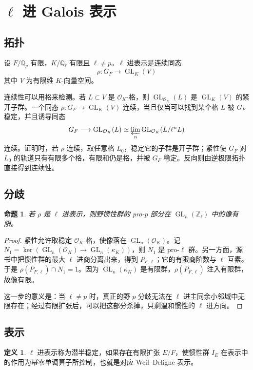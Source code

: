 \documentclass[11pt,a4paper,openany]{ctexbook}
\numberwithin{equation}{chapter}
\newcommand{\Q}{\mathbb{Q}}
\newcommand{\Z}{\mathbb{Z}}
\newcommand{\GL}{\operatorname{GL}}
\theoremstyle{plain}
\newtheorem{proposition}[theorem]{命题}
\theoremstyle{definition}
\newtheorem{definition}[theorem]{定义}
\theoremstyle{remark}
\begin{document}
\section{\texorpdfstring{$\ell$ 进 Galois 表示}{ell 进 Galois 表示}}

\subsection{拓扑}

设 $F/\Q_p$ 有限，$K/\Q_\ell$ 有限且 $\ell\ne p$。$\ell$ 进表示是连续同态
\[
  \rho:G_F\to\GL_K(V)
\]
其中 $V$ 为有限维 $K$-向量空间。

连续性可以用格来检测。若 $L\subset V$ 是 $\mathcal O_K$-格，则 $\GL_{\mathcal O_K}(L)$ 是 $\GL_K(V)$ 的紧开子群。一个同态 $\rho:G_F\to\GL_K(V)$ 连续，当且仅当可以找到某个格 $L$ 被 $G_F$ 稳定，并且诱导同态
\[
  G_F\longrightarrow \GL_{\mathcal O_K}(L)
  \simeq \varprojlim_n\GL_{\mathcal O_K}(L/\ell^nL)
\]
连续。证明时，若 $\rho$ 连续，取任意格 $L_0$，稳定它的子群是开子群；紧性使 $G_F$ 对 $L_0$ 的轨道只有有限多个格，有限和仍是格，并被 $G_F$ 稳定。反向则由逆极限拓扑直接得到连续性。

\subsection{分歧}

\begin{proposition}
若 $\rho$ 是 $\ell$ 进表示，则野惯性群的 pro-$p$ 部分在 $\GL_n(\Z_\ell)$ 中的像有限。
\end{proposition}

\begin{proof}
紧性允许取稳定 $\mathcal O_K$-格，使像落在 $\GL_n(\mathcal O_K)$。记 $N_1=\ker(\GL_n(\mathcal O_K)\to\GL_n(\kappa_K))$，则 $N_1$ 是 pro-$\ell$ 群。另一方面，源书中把惯性群的最大 $\ell$ 进商分离出来，得到 $P_{F,\ell}$；它的有限商阶数与 $\ell$ 互素。于是 $\rho(P_{F,\ell})\cap N_1=1$。因为 $\GL_n(\kappa_K)$ 是有限群，$\rho(P_{F,\ell})$ 注入有限群，故像有限。

这一步的意义是：当 $\ell\ne p$ 时，真正的野 $p$ 分歧无法在 $\ell$ 进主同余小邻域中无限存在；经过有限扩张后，可以把这部分杀掉，只剩温和惯性的 $\ell$ 进方向。
\end{proof}

\subsection{表示}

\begin{definition}
$\ell$ 进表示称为潜半稳定，如果存在有限扩张 $E/F$，使惯性群 $I_E$ 在表示中的作用为幂零单调算子所控制，也就是对应 Weil--Deligne 表示。
\end{definition}
\end{document}
